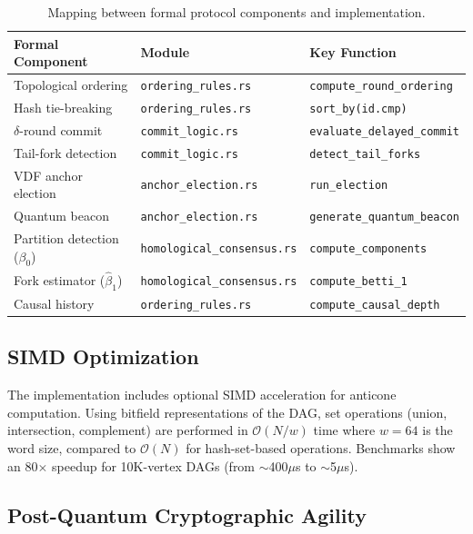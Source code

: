 \documentclass[11pt,a4paper]{article}
\theoremstyle{definition}
\theoremstyle{remark}
\newcommand{\bigO}{\mathcal{O}}
\begin{document}
\begin{table}[t]
\centering
\caption{Mapping between formal protocol components and implementation.}
\label{tab:implementation}
\begin{tabular}{@{}lll@{}}
\toprule
\textbf{Formal Component} & \textbf{Module} & \textbf{Key Function} \\
\midrule
Topological ordering & \texttt{ordering\_rules.rs} & \texttt{compute\_round\_ordering} \\
Hash tie-breaking & \texttt{ordering\_rules.rs} & \texttt{sort\_by(id.cmp)} \\
$\delta$-round commit & \texttt{commit\_logic.rs} & \texttt{evaluate\_delayed\_commit} \\
Tail-fork detection & \texttt{commit\_logic.rs} & \texttt{detect\_tail\_forks} \\
VDF anchor election & \texttt{anchor\_election.rs} & \texttt{run\_election} \\
Quantum beacon & \texttt{anchor\_election.rs} & \texttt{generate\_quantum\_beacon} \\
Partition detection ($\beta_0$) & \texttt{homological\_consensus.rs} & \texttt{compute\_components} \\
Fork estimator ($\hat{\beta}_1$) & \texttt{homological\_consensus.rs} & \texttt{compute\_betti\_1} \\
Causal history & \texttt{ordering\_rules.rs} & \texttt{compute\_causal\_depth} \\
\bottomrule
\end{tabular}
\end{table}

\subsection{SIMD Optimization}

The implementation includes optional SIMD acceleration for anticone
computation.
Using bitfield representations of the DAG, set operations (union,
intersection, complement) are performed in $\bigO(N/w)$ time where
$w = 64$ is the word size, compared to $\bigO(N)$ for hash-set-based
operations.
Benchmarks show an 80$\times$ speedup for 10K-vertex DAGs (from $\sim$400$\mu$s
to $\sim$5$\mu$s).

\subsection{Post-Quantum Cryptographic Agility}
\end{document}
